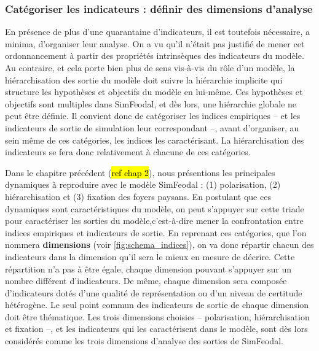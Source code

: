 \subsubsection{Catégoriser les indicateurs : définir des dimensions d'analyse}
En présence de plus d'une quarantaine d'indicateurs, il est toutefois nécessaire, a minima, d'organiser leur analyse.
On a vu qu'il n'était pas justifié de mener cet ordonnancement à partir des propriétés intrinsèques des indicateurs du modèle.
Au contraire, et cela porte bien plus de sens vis-à-vis du rôle d'un modèle, la hiérarchisation des sortie du modèle doit suivre la hiérarchie implicite qui structure les hypothèses et objectifs du modèle en lui-même.
Ces hypothèses et objectifs sont multiples dans SimFeodal, et dès lors, une hiérarchie globale ne peut être définie.
Il convient donc de catégoriser les indices empiriques -- et les indicateurs de sortie de simulation leur correspondant --, avant d'organiser, au sein même de ces catégories, les indices les caractérisant.
La hiérarchisation des indicateurs se fera donc relativement à chacune de ces catégories.

Dans le chapitre précédent (\hl{ref chap 2}), nous présentions les principales dynamiques à reproduire avec le modèle SimFeodal :
(1) polarisation, (2) hiérarchisation et (3) fixation des foyers paysans.
En postulant que ces dynamiques sont caractéristiques du modèle, on peut s'appuyer sur cette triade pour caractériser les sorties du modèle,c'est-à-dire mener la confrontation entre indices empiriques et indicateurs de sortie.
En reprenant ces catégories, que l'on nommera \textbf{dimensions} (voir \cref{fig:schema_indices}), on va donc répartir chacun des indicateurs dans la dimension qu'il sera le mieux en mesure de décrire.
Cette répartition n'a pas à être égale, chaque dimension pouvant s'appuyer sur un nombre différent d'indicateurs.
De même, chaque dimension sera composée d'indicateurs dotés d'une qualité de représentation ou d'un niveau de certitude hétérogène.
Le seul point commun des indicateurs de sortie de chaque dimension doit être thématique.
Les trois dimensions choisies -- polarisation, hiérarchisation et fixation --, et les indicateurs qui les caractérisent dans le modèle, sont dès lors considérés comme les trois dimensions d'analyse des sorties de SimFeodal.

